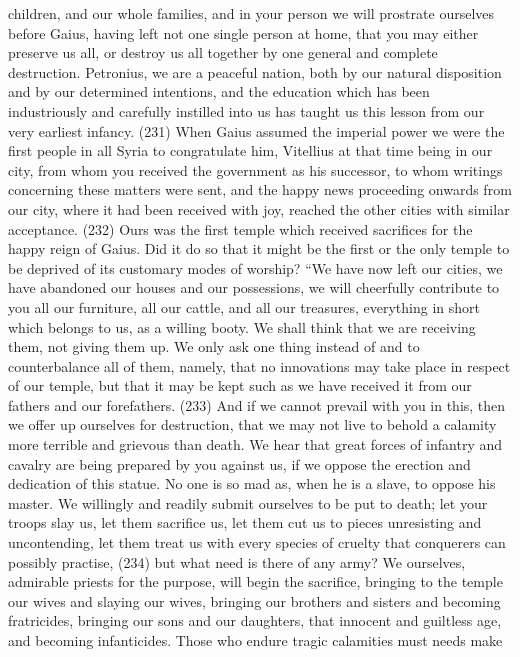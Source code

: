children, and our whole families, and in your person we will prostrate ourselves before Gaius,
having left not one single person at home, that you may either preserve us all, or destroy us all
together by one general and complete destruction. Petronius, we are a peaceful nation, both by our
natural disposition and by our determined intentions, and the education which has been
industriously and carefully instilled into us has taught us this lesson from our very earliest infancy.
(231) When Gaius assumed the imperial power we were the first people in all Syria to congratulate
him, Vitellius at that time being in our city, from whom you received the government as his
successor, to whom writings concerning these matters were sent, and the happy news proceeding
onwards from our city, where it had been received with joy, reached the other cities with similar
acceptance. (232) Ours was the first temple which received sacrifices for the happy reign of
Gaius. Did it do so that it might be the first or the only temple to be deprived of its customary
modes of worship? ``We have now left our cities, we have abandoned our houses and our
possessions, we will cheerfully contribute to you all our furniture, all our cattle, and all our
treasures, everything in short which belongs to us, as a willing booty. We shall think that we are
receiving them, not giving them up. We only ask one thing instead of and to counterbalance all of
them, namely, that no innovations may take place in respect of our temple, but that it may be kept
such as we have received it from our fathers and our forefathers. (233) And if we cannot prevail
with you in this, then we offer up ourselves for destruction, that we may not live to behold a calamity
more terrible and grievous than death. We hear that great forces of infantry and cavalry are being
prepared by you against us, if we oppose the erection and dedication of this statue. No one is so
mad as, when he is a slave, to oppose his master. We willingly and readily submit ourselves to be
put to death; let your troops slay us, let them sacrifice us, let them cut us to pieces unresisting and
uncontending, let them treat us with every species of cruelty that conquerers can possibly practise,
(234) but what need is there of any army? We ourselves, admirable priests for the purpose, will
begin the sacrifice, bringing to the temple our wives and slaying our wives, bringing our brothers
and sisters and becoming fratricides, bringing our sons and our daughters, that innocent and
guiltless age, and becoming infanticides. Those who endure tragic calamities must needs make
